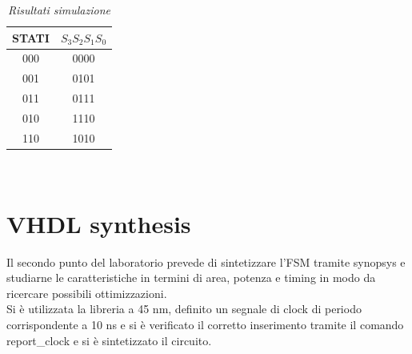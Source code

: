 \begin{table}[!h]\footnotesize
	\centering
	\begin{tabular}{|c|c|}
		\hline
		\textbf{STATI} & \textbf{$S_{3}S_{2}S_{1}S_{0}$}\\
		\hline
		000 & 0000\\
		\hline
		001 &0101 \\
		\hline
		011& 0111\\
		\hline
		010& 1110\\
		\hline
		110& 1010\\
		\hline 
	\end{tabular}
	\caption{\textit{Risultati simulazione}}
	\label{tab2}
\end{table} \\


\section{VHDL synthesis}
Il secondo punto del laboratorio prevede di sintetizzare l’FSM tramite synopsys e studiarne le caratteristiche in termini di area, potenza e timing in modo da ricercare possibili ottimizzazioni.\\Si è utilizzata la libreria a 45 nm, definito un segnale di clock di periodo corrispondente a 10 ns e si è verificato il corretto inserimento tramite il comando report_clock e si è sintetizzato il circuito.\\

